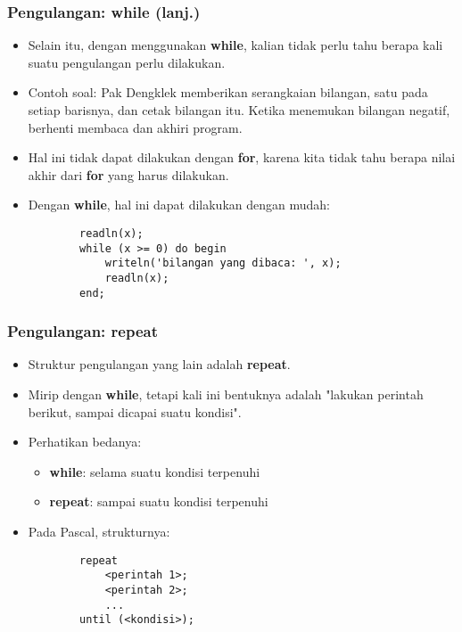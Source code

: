\documentclass{beamer}
\begin{document}
\begin{frame}[fragile]
\frametitle{Pengulangan: while (lanj.)}
\begin{itemize}
    \item Selain itu, dengan menggunakan \textbf{while}, kalian tidak perlu tahu berapa kali suatu pengulangan perlu dilakukan.
    \item Contoh soal: Pak Dengklek memberikan serangkaian bilangan, satu pada setiap barisnya, dan cetak bilangan itu. Ketika menemukan bilangan negatif, berhenti membaca dan akhiri program.
    \item Hal ini tidak dapat dilakukan dengan \textbf{for}, karena kita tidak tahu berapa nilai akhir dari \textbf{for} yang harus dilakukan.
    \item Dengan \textbf{while}, hal ini dapat dilakukan dengan mudah:
    \begin{lstlisting}
        readln(x);
        while (x >= 0) do begin
            writeln('bilangan yang dibaca: ', x);
            readln(x);
        end;
    \end{lstlisting}
\end{itemize}
\end{frame}

\begin{frame}[fragile]
\frametitle{Pengulangan: repeat}
\begin{itemize}
    \item Struktur pengulangan yang lain adalah \textbf{repeat}.
    \item Mirip dengan \textbf{while}, tetapi kali ini bentuknya adalah "lakukan perintah berikut, sampai dicapai suatu kondisi".
    \item Perhatikan bedanya:
    \begin{itemize}
        \item \textbf{while}: selama suatu kondisi terpenuhi
        \item \textbf{repeat}: sampai suatu kondisi terpenuhi
    \end{itemize}
    \item Pada Pascal, strukturnya:
    \begin{lstlisting}
        repeat
            <perintah 1>;
            <perintah 2>;
            ...
        until (<kondisi>);
    \end{lstlisting}
\end{itemize}
\end{frame}
\end{document}
